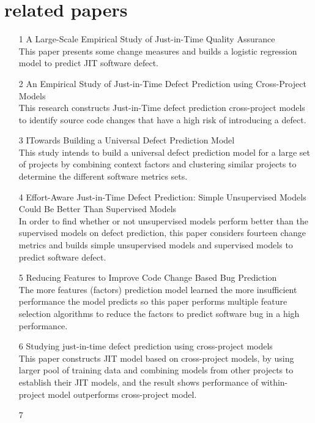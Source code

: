 \documentclass[10pt, conference, compsocconf]{IEEEtran}
\begin{document}
\section{related papers}
\begin{itemize}
	\item[1]
	 A Large-Scale Empirical Study of Just-in-Time Quality Assurance \cite{ICSE:Kamei}\\
	This paper presents some change measures and builds a logistic regression model to predict JIT software defect.
	\item[2]
	An Empirical Study of Just-in-Time Defect Prediction using Cross-Project Models \cite{MSR2014:Fukushima}\\
	This research constructs Just-in-Time defect prediction cross-project models to identify source code changes that have a high risk of introducing a defect.
	\item[3]
	ITowards Building a Universal Defect Prediction Model \cite{MSR2014:Zhang}\\
	This study intends to build a universal defect prediction model for a large set of projects by combining context factors and clustering similar projects to determine the different software metrics sets.
	\item[4]
	Effort-Aware Just-in-Time Defect Prediction: Simple Unsupervised Models Could Be Better Than Supervised Models \cite{FSE2016:Yang}\\
	In order to find whether or not unsupervised models perform better than the supervised models on defect prediction, this paper considers fourteen change metrics and builds simple unsupervised models and supervised models to predict software defect.
	\item[5]
	Reducing Features to Improve Code Change Based Bug Prediction \cite{ICSE2013:Shivaji}\\
	The more features (factors) prediction model learned the more insufficient performance the model predicts so this paper performs multiple feature selection algorithms to reduce the factors to predict software bug in a high performance.
	\item[6]
	Studying just-in-time defect prediction using cross-project models \cite{ESE2016:Kamei}\\
	This paper constructs JIT model based on cross-project models, by using larger pool of training data and combining models from other projects to establish their JIT models, and the result shows performance of within-project model outperforms cross-project model. 
	\item[7]

\end{itemize}
\end{document}
